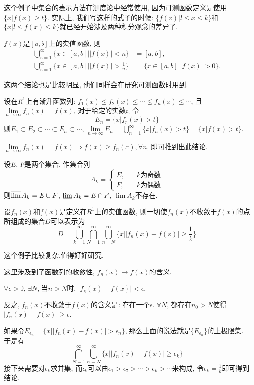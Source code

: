\documentclass[12pt,a4paper,openany]{book}
\begin{document}
这个例子中集合的表示方法在测度论中经常使用, 因为可测函数定义是使用$\{x | f(x) \ge t\}$. 实际上, 我们写这样的式子的时候: $\{f(x) | l \le x \le k\}$和$\{x | l \le f(x) \le k\}$就已经开始涉及两种积分观念的差异了.

$f(x)$是$[a, b]$上的实值函数, 则
$$
\begin{aligned}
\bigcup_{n=1}^{\infty}{\{ x \in [a, b] | |f(x)| < n\}} &= [a, b], \\
\bigcup_{n=1}^{\infty}{\{ x \in [a, b] | |f(x)| > \frac{1}{n}\}} &= \{ x \in [a, b]| |f(x)| > 0 \}.
\end{aligned}
$$

这两个结论也是比较明显, 他们同样会在研究可测函数时用到.

设在$R^1$上有渐升函数列: $f_1(x) \le f_2(x) \le \cdots \le f_n(x) \le \cdots$, 且$\lim\limits_{n \rightarrow \infty}{f_n(x)} = f(x)$, 对于给定的实数$t$, 令
$$
E_n = \{ x | f_n(x) > t \}
$$
则$E_1 \subset E_2 \subset \cdots \subset E_n \subset \cdots$, $\lim\limits_{n \rightarrow \infty}{E_n} = \bigcup\limits_{n=1}^{\infty}{\{x | f_n(x) > t \}} = \{ x | f(x) > t\}$.

$\lim\limits_{n \rightarrow \infty}{f_n(x)} = f(x) \Rightarrow f(x) \ge f_n(x), \forall n$, 即可推到出此结论.

设$E$, $F$是两个集合, 作集合列
$$
A_k = \left\{
\begin{aligned}
E, \quad &k \text{为奇数} \\
F, \quad &k \text{为偶数}
\end{aligned}
\right.
$$
则$\varlimsup{A_k} = E \cup F$, $\varliminf{A_k} = E \cap F$, $\lim{A_k}$不存在.

设$f_n(x)$和$f(x)$是定义在$R^1$上的实值函数, 则一切使$f_n(x)$不收敛于$f(x)$的点所组成的集合$D$可以表示为
$$
D = \bigcup_{k=1}^{\infty}{\bigcap_{N=1}^{\infty}{\bigcup_{n=N}^{\infty}{\{ x||f_n(x) - f(x)| \ge \frac{1}{k} \}}}}
$$

这个例子比较复杂,值得好好研究.

这里涉及到了函数列的收敛性, $f_n(x) \rightarrow f(x)$的含义:

$\forall \epsilon > 0$, $\exists N$, 当$n > N$时, $|f_n(x) - f(x)| < \epsilon$,

反之, $f_n(x)$不收敛于$f(x)$的含义是: 存在一个$\epsilon$. $\forall N$, 都存在$n_0 > N$使得$|f_n(x) - f(x)| \ge \epsilon$.

如果令$E_{\epsilon_n} = \{ x | |f_n(x) - f(x)| > \epsilon_n \}$, 那么上面的说法就是$\{E_{\epsilon_n}\}$的上极限集. 于是有
$$
\bigcap_{N=1}^{\infty}{\bigcup_{n=N}^{\infty}{\{ x||f_n(x) - f(x)| \ge \epsilon_k \}}}
$$
接下来需要对$\epsilon_k$求并集, 而$\epsilon_k$可以由$\epsilon_1 > \epsilon_2 > \cdots > \epsilon_k > \cdots$来构成, 令$\epsilon_k = \frac{1}{k}$即可得到结论.
\end{document}
